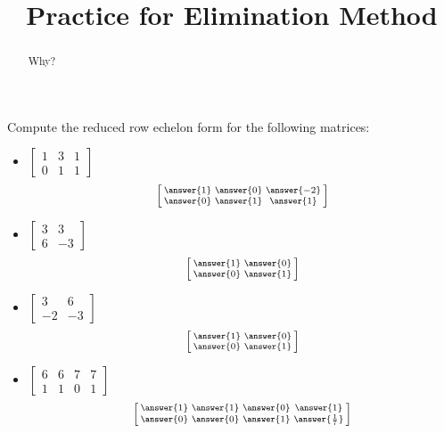 \documentclass{ximera}
\title{Practice for Elimination Method}
\begin{document}
\begin{abstract}
Why?
\end{abstract}
\maketitle


\begin{exercise}
    Compute the reduced row echelon form for the following matrices:
    \begin{itemize}
        \item
        $\begin{bmatrix}
            1 & 3 & 1 \\
            0 & 1 & 1
        \end{bmatrix}$
        \[
            \left[\begin{smallmatrix} \answer{1} & \answer{0} & \answer{-2} \\ \answer{0} & \answer{1} & \answer{1} \end{smallmatrix}\right]
        \]
        \item
        $\begin{bmatrix}
            3 & 3 \\
            6 & -3
        \end{bmatrix}$
        \[
            \left[\begin{smallmatrix} \answer{1} & \answer{0} \\ \answer{0} & \answer{1} \end{smallmatrix}\right]
        \]
        \item
        $\begin{bmatrix}
            3 & 6 \\
            -2 & -3
        \end{bmatrix}$
        \[
            \left[\begin{smallmatrix} \answer{1} & \answer{0} \\ \answer{0} & \answer{1} \end{smallmatrix}\right]
        \]
        \item
        $\begin{bmatrix}
            6 & 6 & 7 & 7 \\
            1 & 1 & 0 & 1
        \end{bmatrix}$
        \[
            \left[\begin{smallmatrix} \answer{1} & \answer{1} & \answer{0} & \answer{1} \\ \answer{0} & \answer{0} & \answer{1} & \answer{\frac{1}{7}} \end{smallmatrix}\right]
\]
\end{itemize}
\end{exercise}
\end{document}
